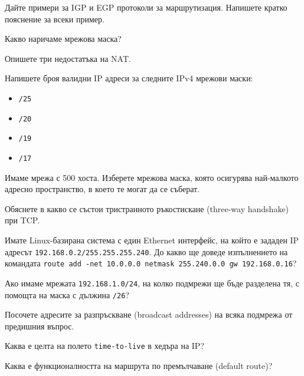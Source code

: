 \begin{questions}
\begin{center}
  \end{center}

  \question Дайте примери за IGP и EGP протоколи за маршрутизация. Напишете
  кратко пояснение за всеки пример.

  \question Какво наричаме мрежова маска?

  \question Опишете три недостатъка на NAT.

  \question Напишете броя валидни IP адреси за следните IPv4 мрежови маски:
  \begin{itemize}
    \item \texttt{/25}
    \item \texttt{/20}
    \item \texttt{/19}
    \item \texttt{/17}
  \end{itemize}

  \question Имаме мрежа с 500 хоста. Изберете мрежова маска, която осигурява
  най-малкото адресно пространство, в което те могат да се съберат.

  \question Обяснете в какво се състои тристранното ръкостискане
  (\foreignlanguage{english}{three-way handshake}) при TCP.

  \question Имате Linux-базирана система с един Ethernet интерфейс, на който е
  зададен IP адресът \texttt{192.168.0.2/255.255.255.240}. До какво ще доведе
  изпълнението на командата \texttt{route add -net 10.0.0.0 netmask 255.240.0.0
    gw 192.168.0.16}?

  \question Ако имаме мрежата \texttt{192.168.1.0/24}, на колко подмрежи ще бъде
  разделена тя, с помощта на маска с дължина \texttt{/26}?

  \question Посочете адресите за разпръскване
  (\foreignlanguage{english}{broadcast addresses}) на всяка подмрежа от
  предишния въпрос.

  \question Каква е целта на полето \texttt{time-to-live} в хедъра на IP?

  \question Каква е функционалността на маршрута по премълчаване
  (\foreignlanguage{english}{default route})?


\end{questions}

